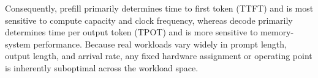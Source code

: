 Consequently, prefill primarily determines time to first token (TTFT) and is most sensitive to compute capacity and clock frequency, whereas decode primarily determines time per output token (TPOT) and is more sensitive to memory-system performance.
Because real workloads vary widely in prompt length, output length, and arrival rate, any fixed hardware assignment or operating point is inherently suboptimal across the workload space.

